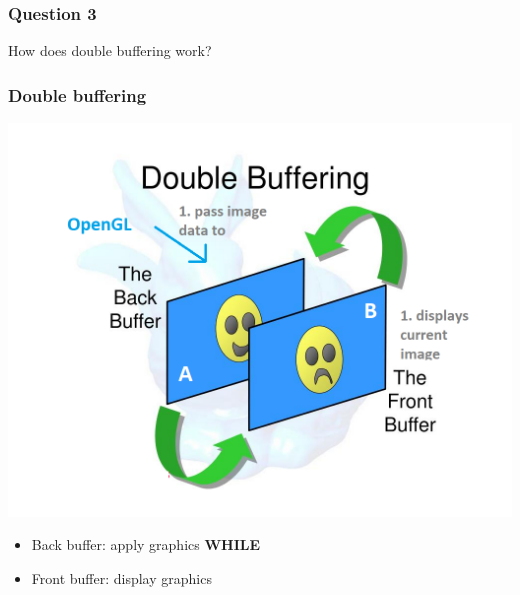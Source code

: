 \documentclass{beamer}
\begin{document}
\begin{frame}
    \frametitle{Question 3}
    How does double buffering work?
\end{frame}

\begin{frame}
    \frametitle{Double buffering}

    \begin{center}
        \includegraphics[scale=0.4]{q3-step1.png}
    \end{center}

    \begin{itemize}
        \item Back buffer: apply graphics \textbf{WHILE}
        \item Front buffer: display graphics 
    \end{itemize}

\end{frame}
\end{document}
